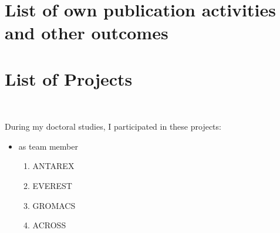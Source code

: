 \chapter*{List of own publication activities and other outcomes}
\label{ch:listofstudentsownpublicationactivitiesandotheroutcomes}

\begin{refsection}
\nocite{bohm_runtime_2020, di_girolamo_network-accelerated_2019, di_girolamo_risc-v_2021}
\printbibliography[heading=subbibintoc, title={Publications Related to Thesis}]
\end{refsection}

\begin{refsection}
\nocite{besta_graphminesuite_2021, besta_sisa_2021, bohm_haydi_2018, golasowski_alternative_2020,
martinovic_distributed_2020}
\printbibliography[heading=subbibintoc, title={Publications Not Related to Thesis}]
\end{refsection}

\chapter*{List of Projects}
\label{ch:listofprojects}~
During my doctoral studies, I participated in these projects:
\begin{itemize}
	\item as team member
		\begin{enumerate}
			\item ANTAREX
			\item EVEREST
			\item GROMACS
			\item ACROSS
		\end{enumerate}
\end{itemize}

